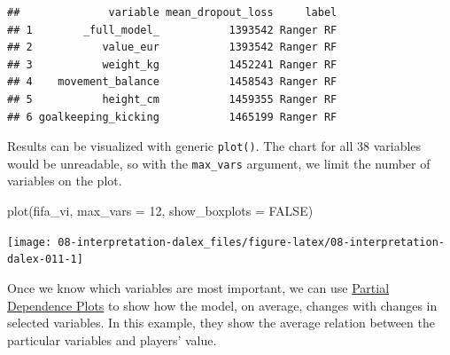 \documentclass[
]{scrbook}
\newenvironment{Shaded}{\begin{snugshade}}{\end{snugshade}}
\newcommand{\AttributeTok}[1]{\textcolor[rgb]{0.77,0.63,0.00}{#1}}
\newcommand{\ConstantTok}[1]{\textcolor[rgb]{0.00,0.00,0.00}{#1}}
\newcommand{\DecValTok}[1]{\textcolor[rgb]{0.00,0.00,0.81}{#1}}
\newcommand{\FunctionTok}[1]{\textcolor[rgb]{0.00,0.00,0.00}{#1}}
\newcommand{\NormalTok}[1]{#1}
\newcommand{\OtherTok}[1]{\textcolor[rgb]{0.56,0.35,0.01}{#1}}
\newcommand{\SpecialCharTok}[1]{\textcolor[rgb]{0.00,0.00,0.00}{#1}}
\newcommand{\StringTok}[1]{\textcolor[rgb]{0.31,0.60,0.02}{#1}}
\renewenvironment{Shaded} {\begin{snugshade}\small} {\end{snugshade}}
\begin{document}
\begin{verbatim}
##              variable mean_dropout_loss     label
## 1        _full_model_           1393542 Ranger RF
## 2           value_eur           1393542 Ranger RF
## 3           weight_kg           1452241 Ranger RF
## 4    movement_balance           1458543 Ranger RF
## 5           height_cm           1459355 Ranger RF
## 6 goalkeeping_kicking           1465199 Ranger RF
\end{verbatim}

Results can be visualized with generic \texttt{plot()}. The chart for all 38 variables would be unreadable, so with the \texttt{max\_vars} argument, we limit the number of variables on the plot.

\begin{Shaded}
\begin{Highlighting}[]
\FunctionTok{plot}\NormalTok{(fifa\_vi, }\AttributeTok{max\_vars =} \DecValTok{12}\NormalTok{, }\AttributeTok{show\_boxplots =} \ConstantTok{FALSE}\NormalTok{)}
\end{Highlighting}
\end{Shaded}

\begin{center}\texttt{[image: 08-interpretation-dalex\_files/figure-latex/08-interpretation-dalex-011-1]} \end{center}

Once we know which variables are most important, we can use \href{https://pbiecek.github.io/ema/partialDependenceProfiles.html}{Partial Dependence Plots} to show how the model, on average, changes with changes in selected variables. In this example, they show the average relation between the particular variables and players' value.

\begin{Shaded}
\end{Shaded}
\end{document}
